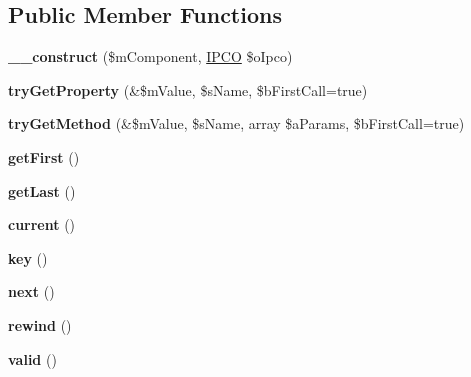 \subsection*{Public Member Functions}
\begin{DoxyCompactItemize}
\item 
\hypertarget{class_i_p_c_o___array_component_wrapper_aed8c98e48234602749bbbc9b60cc32fe}{{\bfseries \-\_\-\-\_\-construct} (\$m\-Component, \hyperlink{class_i_p_c_o}{I\-P\-C\-O} \$o\-Ipco)}\label{class_i_p_c_o___array_component_wrapper_aed8c98e48234602749bbbc9b60cc32fe}

\item 
\hypertarget{class_i_p_c_o___array_component_wrapper_a195e45c343d20e87cbb0a8650ce2b475}{{\bfseries try\-Get\-Property} (\&\$m\-Value, \$s\-Name, \$b\-First\-Call=true)}\label{class_i_p_c_o___array_component_wrapper_a195e45c343d20e87cbb0a8650ce2b475}

\item 
\hypertarget{class_i_p_c_o___array_component_wrapper_a37d44a3f265b675a976d21a6e4c22192}{{\bfseries try\-Get\-Method} (\&\$m\-Value, \$s\-Name, array \$a\-Params, \$b\-First\-Call=true)}\label{class_i_p_c_o___array_component_wrapper_a37d44a3f265b675a976d21a6e4c22192}

\item 
\hypertarget{class_i_p_c_o___array_component_wrapper_aa4469b41caa046ff913bcd93bfaea502}{{\bfseries get\-First} ()}\label{class_i_p_c_o___array_component_wrapper_aa4469b41caa046ff913bcd93bfaea502}

\item 
\hypertarget{class_i_p_c_o___array_component_wrapper_a2ff4e5a0ccfa8d1feb361730febaf808}{{\bfseries get\-Last} ()}\label{class_i_p_c_o___array_component_wrapper_a2ff4e5a0ccfa8d1feb361730febaf808}

\item 
\hypertarget{class_i_p_c_o___array_component_wrapper_a43578834b304e4db06e67456eb5ff318}{{\bfseries current} ()}\label{class_i_p_c_o___array_component_wrapper_a43578834b304e4db06e67456eb5ff318}

\item 
\hypertarget{class_i_p_c_o___array_component_wrapper_a9a18c958826289e13af4d2a92ee3e817}{{\bfseries key} ()}\label{class_i_p_c_o___array_component_wrapper_a9a18c958826289e13af4d2a92ee3e817}

\item 
\hypertarget{class_i_p_c_o___array_component_wrapper_a58d700e3e51bfd1c8222ab4adb52ab4d}{{\bfseries next} ()}\label{class_i_p_c_o___array_component_wrapper_a58d700e3e51bfd1c8222ab4adb52ab4d}

\item 
\hypertarget{class_i_p_c_o___array_component_wrapper_a7035e0f17e1cc39d3b30f9d12f26fc71}{{\bfseries rewind} ()}\label{class_i_p_c_o___array_component_wrapper_a7035e0f17e1cc39d3b30f9d12f26fc71}

\item 
\hypertarget{class_i_p_c_o___array_component_wrapper_aa951636e07738287c0c04de6ff8623dd}{{\bfseries valid} ()}\label{class_i_p_c_o___array_component_wrapper_aa951636e07738287c0c04de6ff8623dd}

\end{DoxyCompactItemize}
